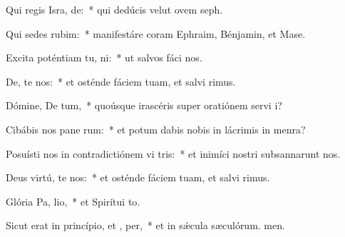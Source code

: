 \item Qui regis Isra, de:~* qui dedúcis velut ovem seph.
\item Qui sedes  rubim:~* manifestáre coram Ephraim, Bénjamin, et Mase.
\item Excita poténtiam tu,  ni:~* ut salvos fáci nos.
\item De, te nos:~* et osténde fáciem tuam, et salvi rimus.
\item Dómine, De tum,~* quoúsque irascéris super oratiónem servi i?
\item Cibábis nos pane rum:~* et potum dabis nobis in lácrimis in menra?
\item Posuísti nos in contradictiónem vi tris:~* et inimíci nostri subsannarunt nos.
\item Deus virtú, te nos:~* et osténde fáciem tuam, et salvi rimus.
\item Glória Pa,  lio,~* et Spirítui to.
\item Sicut erat in princípio, et ,  per,~* et in sǽcula sæculórum. men.

